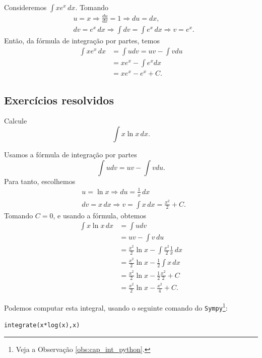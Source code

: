 \begin{ex}
  Consideremos $\int xe^x\,dx$. Tomando
  \begin{align}
    &u = x \Rightarrow \frac{du}{dx} = 1 \Rightarrow du = dx,\\
    &dv = e^x\,dx \Rightarrow \int dv = \int e^x\,dx \Rightarrow v = e^x.
  \end{align}
  Então, da fórmula de integração por partes, temos
  \begin{align}
    \int xe^x\,dx &= \int udv = uv - \int vdu\\
                  &= xe^x - \int e^xdx\\
                  &= xe^x - e^x + C.
  \end{align}
\end{ex}

\subsection*{Exercícios resolvidos}

\begin{exeresol}
  Calcule
  \begin{equation}
    \int x\ln x\,dx.
  \end{equation}
\end{exeresol}
\begin{resol}
  Usamos a fórmula de integração por partes
  \begin{equation}
    \int udv = uv - \int vdu.
  \end{equation}
  Para tanto, escolhemos
  \begin{align}
    &u = \ln x \Rightarrow du = \frac{1}{x}\,dx\\
    &dv = x\,dx \Rightarrow v = \int x\,dx = \frac{x^2}{2}+C.
  \end{align}
  Tomando $C=0$, e usando a fórmula, obtemos
  \begin{align}
    \int x\ln x\,dx &= \int udv\\
                    &= uv - \int v\,du\\
                    &= \frac{x^2}{2}\ln x - \int \frac{x^2}{2}\frac{1}{x}\,dx\\
                    &= \frac{x^2}{2}\ln x - \frac{1}{2}\int x\,dx\\
                    &= \frac{x^2}{2}\ln x - \frac{1}{2}\frac{x^2}{2} + C\\
                    &= \frac{x^2}{2}\ln x - \frac{x^2}{4} + C.
  \end{align}

  \ifispython
  Podemos computar esta integral, usando o seguinte comando do \verb+Sympy+\footnote{Veja a Observação \ref{obs:cap_int_python}.}:
\begin{verbatim}
integrate(x*log(x),x)
\end{verbatim}
  \fi
\end{resol}

